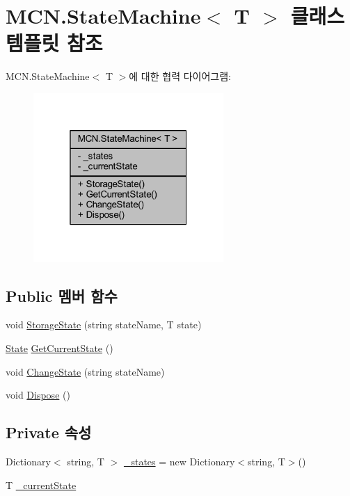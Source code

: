 \hypertarget{class_m_c_n_1_1_state_machine}{}\section{M\+C\+N.\+State\+Machine$<$ T $>$ 클래스 템플릿 참조}
\label{class_m_c_n_1_1_state_machine}


M\+C\+N.\+State\+Machine$<$ T $>$에 대한 협력 다이어그램\+:\nopagebreak
\begin{figure}[H]
\begin{center}
\leavevmode
\includegraphics[width=205pt]{class_m_c_n_1_1_state_machine__coll__graph}
\end{center}
\end{figure}
\subsection*{Public 멤버 함수}
\begin{DoxyCompactItemize}
\item 
void \hyperlink{class_m_c_n_1_1_state_machine_a30d168379929d5bdb050f211e6273a8b}{Storage\+State} (string state\+Name, T state)
\item 
\hyperlink{class_m_c_n_1_1_state}{State} \hyperlink{class_m_c_n_1_1_state_machine_a9c40c6eb8f992b4f7a2d81415376fd56}{Get\+Current\+State} ()
\item 
void \hyperlink{class_m_c_n_1_1_state_machine_a81eb33948ad947f9ef9c0771542a8c47}{Change\+State} (string state\+Name)
\item 
void \hyperlink{class_m_c_n_1_1_state_machine_a19c64816c4a7701a5e8658ab786a1615}{Dispose} ()
\end{DoxyCompactItemize}
\subsection*{Private 속성}
\begin{DoxyCompactItemize}
\item 
Dictionary$<$ string, T $>$ \hyperlink{class_m_c_n_1_1_state_machine_adf0f1417aacb073306b88563e7b3d740}{\+\_\+states} = new Dictionary$<$string, T$>$()
\item 
T \hyperlink{class_m_c_n_1_1_state_machine_a040bf7c13d5127fe983af2ef0a6315ec}{\+\_\+current\+State}
\end{DoxyCompactItemize}


